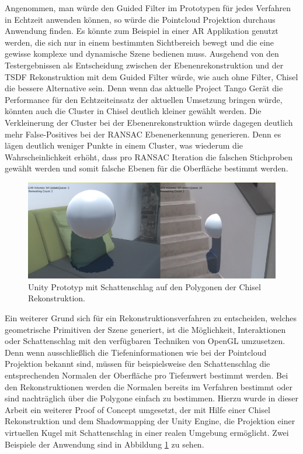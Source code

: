 Angenommen, man würde den Guided Filter im Prototypen für jedes Verfahren in Echtzeit anwenden können, so würde die Pointcloud Projektion durchaus Anwendung finden. Es könnte zum Beispiel in einer AR Applikation genutzt werden, die sich nur in einem bestimmten Sichtbereich bewegt und die eine gewisse komplexe und dynamische Szene bedienen muss. Ausgehend von den Testergebnissen als Entscheidung zwischen der Ebenenrekonstruktion und der TSDF Rekonstruktion mit dem Guided Filter würde, wie auch ohne Filter, Chisel die bessere Alternative sein. Denn wenn das aktuelle Project Tango Gerät die Performance für den Echtzeiteinsatz der aktuellen Umsetzung bringen würde, könnten auch die Cluster in Chisel deutlich kleiner gewählt werden. Die Verkleinerung der Cluster bei der Ebenenrekonstruktion würde dagegen deutlich mehr False-Positives bei der RANSAC Ebenenerkennung generieren. Denn es lägen deutlich weniger Punkte in einem Cluster, was wiederum die Wahrscheinlichkeit erhöht, dass pro RANSAC Iteration die falschen Stichproben gewählt werden und somit falsche Ebenen für die Oberfläche bestimmt werden.

\begin{figure}[h]
  \centering
	\includegraphics[width=1.0\textwidth]{content/images/shadow.png} 
  \caption{Unity Prototyp mit Schattenschlag auf den Polygonen der Chisel Rekonstruktion.}
  \label{fig:shadow}
\end{figure}

Ein weiterer Grund sich für ein Rekonstruktionsverfahren zu entscheiden, welches geometrische Primitiven der Szene generiert, ist die Möglichkeit, Interaktionen oder Schattenschlag mit den verfügbaren Techniken von OpenGL umzusetzen. Denn wenn ausschließlich die Tiefeninformationen wie bei der Pointcloud Projektion bekannt sind, müssen für beispielsweise den Schattenschlag die entsprechenden Normalen der Oberfläche pro Tiefenwert bestimmt werden. Bei den Rekonstruktionen werden die Normalen bereits im Verfahren bestimmt oder sind nachträglich über die Polygone einfach zu bestimmen. Hierzu wurde in dieser Arbeit ein weiterer Proof of Concept umgesetzt, der mit Hilfe einer Chisel Rekonstruktion und dem Shadowmapping der Unity Engine, die Projektion einer virtuellen Kugel mit Schattenschlag in einer realen Umgebung ermöglicht. Zwei Beispiele der Anwendung sind in Abbildung \ref{fig:shadow} zu sehen.


